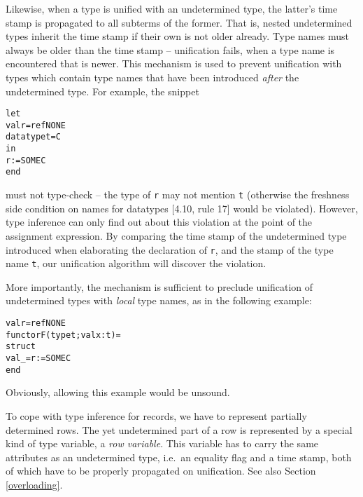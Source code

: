 \documentclass[twoside,titlepage]{article}
\begin{document}
Likewise, when a type is unified with an undetermined type, the latter's time stamp is propagated to all subterms of the former. That is, nested undetermined types inherit the time stamp if their own is not older already. Type names must always be older than the time stamp -- unification fails, when a type name is encountered that is newer. This mechanism is used to prevent unification with types which contain type names that have been introduced {\em after} the undetermined type. For example, the snippet

\begin{quoting}
\begin{alltt}
let
  val r = ref NONE
  datatype t = C
in
  r := SOME C
end
\end{alltt}
\end{quoting}

must not type-check -- the type of {\tt r} may not mention {\tt t} (otherwise the freshness side condition on names for datatypes [4.10, rule 17] would be violated). However, type inference can only find out about this violation at the point of the assignment expression. By comparing the time stamp of the undetermined type introduced when elaborating the declaration of {\tt r}, and the stamp of the type name {\tt t}, our unification algorithm will discover the violation.

More importantly, the mechanism is sufficient to preclude unification of undetermined types with {\em local} type names, as in the following example:

\begin{quoting}
\begin{alltt}
val r = ref NONE
functor F(type t; val x : t) =
struct
  val _ = r := SOME C
end
\end{alltt}
\end{quoting}

Obviously, allowing this example would be unsound.


To cope with type inference for records, we have to represent partially determined rows. The yet undetermined part of a row is represented by a special kind of type variable, a {\em row variable}. This variable has to carry the same attributes as an undetermined type, i.e.\ an equality flag and a time stamp, both of which have to be properly propagated on unification. See also Section \ref{overloading}.
\end{document}

